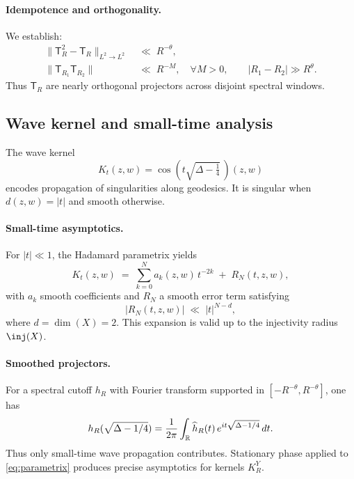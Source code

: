 \paragraph{Idempotence and orthogonality.}
We establish:
\begin{align}
  \|\mathsf{T}_R^2 - \mathsf{T}_R\|_{L^2\to L^2} &\;\ll\; R^{-\theta}, \label{eq:approx-idempotence}\\
  \|\mathsf{T}_{R_1}\mathsf{T}_{R_2}\| &\;\ll\; R^{-M}, \quad \forall M>0, \qquad |R_1-R_2|\gg R^\theta.
  \label{eq:orthogonality}
\end{align}
Thus $\mathsf{T}_R$ are nearly orthogonal projectors across disjoint spectral windows.

\subsection{Wave kernel and small-time analysis}\label{subsec:wave}

The wave kernel
\begin{equation}\label{eq:wave-kernel}
  K_t(z,w) = \cos\!\left(t\sqrt{\Delta-\tfrac14}\,\right)(z,w)
\end{equation}
encodes propagation of singularities along geodesics.  
It is singular when $d(z,w)=|t|$ and smooth otherwise.

\paragraph{Small-time asymptotics.}
For $|t|\ll 1$, the Hadamard parametrix yields
\begin{equation}\label{eq:parametrix}
  K_t(z,w) \;=\; \sum_{k=0}^N a_k(z,w)\,t^{-2k}
    \;+\; R_N(t,z,w),
\end{equation}
with $a_k$ smooth coefficients and $R_N$ a smooth error term satisfying
\[
  |R_N(t,z,w)| \;\ll\; |t|^{N-d},
\]
where $d=\dim(X)=2$.  
This expansion is valid up to the injectivity radius $\inj(X)$.

\paragraph{Smoothed projectors.}
For a spectral cutoff $h_R$ with Fourier transform supported in 
$[-R^{-\theta},R^{-\theta}]$, one has
\begin{equation}\label{eq:smoothed-proj}
  h_R(\sqrt{\Delta-1/4})
  = \frac{1}{2\pi}\int_{\mathbb{R}} \widehat{h}_R(t)\, e^{it\sqrt{\Delta-1/4}}\,dt.
\end{equation}
Thus only small-time wave propagation contributes.  
Stationary phase applied to \eqref{eq:parametrix} produces precise asymptotics for kernels $K_R^Y$.

